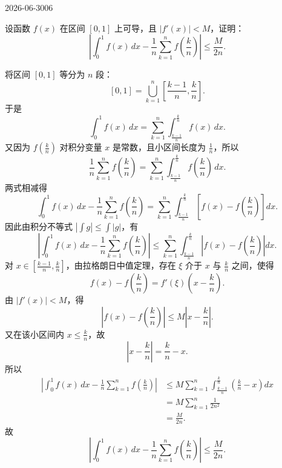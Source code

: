 \begin{mistake}{2026-06-30}{06}

\begin{problemcontent}
设函数 \(f(x)\) 在区间 \([0,1]\) 上可导，且 \(|f'(x)|<M\)，证明：
\[
\left|\int_0^1 f(x)\,dx-\frac1n\sum_{k=1}^n f\left(\frac{k}{n}\right)\right|\le \frac{M}{2n}.
\]
\end{problemcontent}

\begin{solutioncontent}
将区间 \([0,1]\) 等分为 \(n\) 段：
\[
[0,1]=\bigcup_{k=1}^n \left[\frac{k-1}{n},\frac{k}{n}\right].
\]
于是
\[
\int_0^1 f(x)\,dx
=\sum_{k=1}^n \int_{\frac{k-1}{n}}^{\frac{k}{n}} f(x)\,dx.
\]
又因为 \(f\left(\frac{k}{n}\right)\) 对积分变量 \(x\) 是常数，且小区间长度为 \(\frac1n\)，所以
\[
\frac1n\sum_{k=1}^n f\left(\frac{k}{n}\right)
=\sum_{k=1}^n \int_{\frac{k-1}{n}}^{\frac{k}{n}} f\left(\frac{k}{n}\right)\,dx.
\]
两式相减得
\[
\int_0^1 f(x)\,dx-\frac1n\sum_{k=1}^n f\left(\frac{k}{n}\right)
=\sum_{k=1}^n \int_{\frac{k-1}{n}}^{\frac{k}{n}}\left[f(x)-f\left(\frac{k}{n}\right)\right]dx.
\]
因此由积分不等式 \(\left|\int g\right|\le \int |g|\)，有
\[
\left|\int_0^1 f(x)\,dx-\frac1n\sum_{k=1}^n f\left(\frac{k}{n}\right)\right|
\le
\sum_{k=1}^n \int_{\frac{k-1}{n}}^{\frac{k}{n}}\left|f(x)-f\left(\frac{k}{n}\right)\right|dx.
\]
对 \(x\in\left[\frac{k-1}{n},\frac{k}{n}\right]\)，由拉格朗日中值定理，存在 \(\xi\) 介于 \(x\) 与 \(\frac{k}{n}\) 之间，使得
\[
f(x)-f\left(\frac{k}{n}\right)=f'(\xi)\left(x-\frac{k}{n}\right).
\]
由 \(|f'(x)|<M\)，得
\[
\left|f(x)-f\left(\frac{k}{n}\right)\right|
\le M\left|x-\frac{k}{n}\right|.
\]
又在该小区间内 \(x\le \frac{k}{n}\)，故
\[
\left|x-\frac{k}{n}\right|=\frac{k}{n}-x.
\]
所以
\[
\begin{aligned}
\left|\int_0^1 f(x)\,dx-\frac1n\sum_{k=1}^n f\left(\frac{k}{n}\right)\right|
&\le M\sum_{k=1}^n \int_{\frac{k-1}{n}}^{\frac{k}{n}}\left(\frac{k}{n}-x\right)dx \\
&=M\sum_{k=1}^n \frac{1}{2n^2} \\
&=\frac{M}{2n}.
\end{aligned}
\]
故
\[
\left|\int_0^1 f(x)\,dx-\frac1n\sum_{k=1}^n f\left(\frac{k}{n}\right)\right|\le \frac{M}{2n}.
\]
\end{solutioncontent}


\end{mistake}

